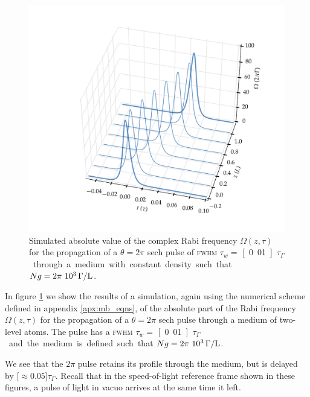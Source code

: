     \begin{figure}[]
      \includegraphics[width=\linewidth]
        {figs/03_nonlinear/coh_sech_2_0pi_fwhm0_010_Ng01000_fig4.pdf}
      \caption{
      Simulated absolute value of the complex Rabi frequency $\Omega(z, \tau)$
      for the propagation of a $\theta = 2\pi$ sech pulse of \textsc{fwhm}
      $\tau_w = $ \unit[0.01]{$\tau_\Gamma$} through a medium with
      constant density such that $Ng = \unit[2\pi~10^3]{\Gamma/L}$.
      }
      \label{fig:2pi_sech_simulton_3d}
    \end{figure}

    In figure \ref{fig:2pi_sech_simulton_3d} we show the results of a
    simulation, again using the numerical scheme defined in appendix
    \ref{apx:mb_eqns}, of the absolute part of the Rabi frequency $\Omega(z,
    \tau)$ for the propagation of a $\theta = 2\pi$ sech pulse through a medium
    of two-level atoms. The pulse has a \textsc{fwhm} $\tau_w = $
    \unit[0.01]{$\tau_\Gamma$} and the medium is defined such that $Ng =
    \unit[2\pi~10^3]{\Gamma/L}$.

    We see that the $2\pi$ pulse retains its profile through the medium, but is
    delayed by \unit[$\approx 0.05$]{$\tau_\Gamma$}. Recall that in the
    speed-of-light reference frame shown in these figures, a pulse of light in
    vacuo arrives at the same time it left.

